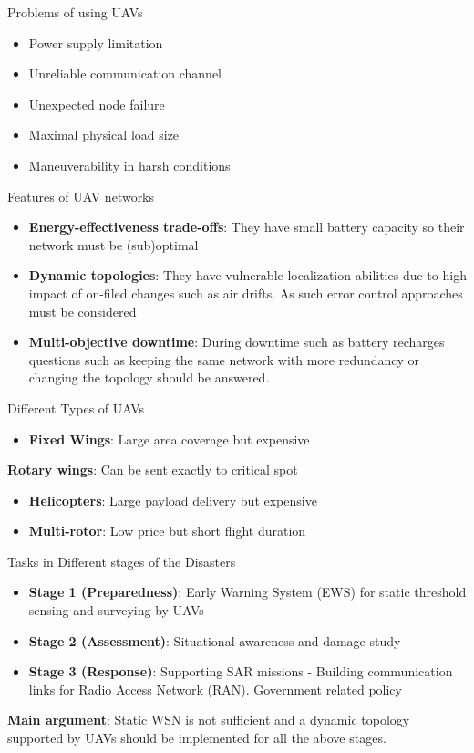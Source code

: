 \documentclass[unknownkeysallowed]{beamer}
\begin{document}
\begin{frame}{Problems of using UAVs}
	\begin{itemize}
		\item Power supply limitation
		\item Unreliable communication channel
		\item Unexpected node failure
		\item Maximal physical load size
		\item Maneuverability in harsh conditions
	\end{itemize}
\end{frame}

\begin{frame}{Features of UAV networks}
	\begin{itemize}
		\item \textbf{Energy-effectiveness trade-offs}: They have small battery capacity so their network must be (sub)optimal
		\item \textbf{Dynamic topologies}: They have vulnerable localization abilities due to high impact of on-filed changes such as air drifts. As such error control approaches must be considered
		\item \textbf{Multi-objective downtime}: During downtime such as battery recharges questions such as keeping the same network with more redundancy or changing the topology should be answered. 
	\end{itemize}
\end{frame}

\begin{frame}{Different Types of UAVs}
	\begin{itemize}
		\item \textbf{Fixed Wings}: Large area coverage but expensive
	\end{itemize}
	
	\textbf{Rotary wings}: Can be sent exactly to critical spot
	\begin{itemize}
		\item \textbf{Helicopters}: Large payload delivery but expensive
		\item \textbf{Multi-rotor}: Low price but short flight duration
	\end{itemize}
\end{frame}

\begin{frame}{Tasks in Different stages of the Disasters}
	\begin{itemize}
		\item \textbf{Stage 1 (Preparedness)}: Early Warning System (EWS) for static threshold sensing and surveying by UAVs
		\item \textbf{Stage 2 (Assessment)}: Situational awareness and damage study
		\item \textbf{Stage 3 (Response)}: Supporting SAR missions - Building communication links for Radio Access Network  (RAN). Government related policy
	\end{itemize}
	\textbf{Main argument}: Static WSN is not sufficient and a dynamic topology supported by UAVs should be implemented for all the above stages. 
\end{frame}
\end{document}

